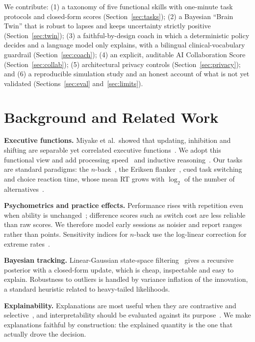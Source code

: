 \documentclass[conference]{IEEEtran}
\begin{document}
We contribute: (1) a taxonomy of five functional skills with one-minute task protocols and closed-form scores (Section~\ref{sec:tasks}); (2) a Bayesian ``Brain Twin'' that is robust to lapses and keeps uncertainty strictly positive (Section~\ref{sec:twin}); (3) a faithful-by-design coach in which a deterministic policy decides and a language model only explains, with a bilingual clinical-vocabulary guardrail (Section~\ref{sec:coach}); (4) an explicit, auditable AI Collaboration Score (Section~\ref{sec:collab}); (5) architectural privacy controls (Section~\ref{sec:privacy}); and (6) a reproducible simulation study and an honest account of what is not yet validated (Sections~\ref{sec:eval} and~\ref{sec:limits}).

\section{Background and Related Work}
\textbf{Executive functions.} Miyake et al.\ showed that updating, inhibition and shifting are separable yet correlated executive functions~\cite{miyake2000}. We adopt this functional view and add processing speed~\cite{salthouse1996} and inductive reasoning~\cite{raven1938}. Our tasks are standard paradigms: the $n$-back~\cite{kirchner1958}, the Eriksen flanker~\cite{eriksen1974}, cued task switching~\cite{monsell2003} and choice reaction time, whose mean RT grows with $\log_2$ of the number of alternatives~\cite{hick1952}.

\textbf{Psychometrics and practice effects.} Performance rises with repetition even when ability is unchanged~\cite{calamia2012}; difference scores such as switch cost are less reliable than raw scores. We therefore model early sessions as noisier and report ranges rather than points. Sensitivity indices for $n$-back use the log-linear correction for extreme rates~\cite{hautus1995}.

\textbf{Bayesian tracking.} Linear-Gaussian state-space filtering~\cite{kalman1960} gives a recursive posterior with a closed-form update, which is cheap, inspectable and easy to explain. Robustness to outliers is handled by variance inflation of the innovation, a standard heuristic related to heavy-tailed likelihoods.

\textbf{Explainability.} Explanations are most useful when they are contrastive and selective~\cite{miller2019}, and interpretability should be evaluated against its purpose~\cite{doshi2017}. We make explanations faithful by construction: the explained quantity is the one that actually drove the decision.
\end{document}
